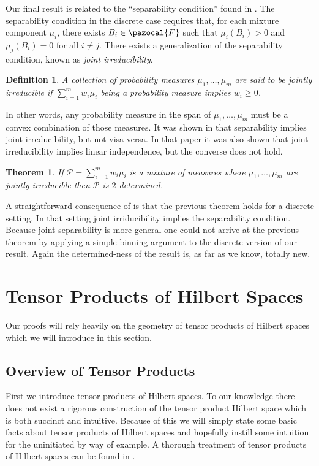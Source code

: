 \documentclass[aos]{imsart}
\def\sF{\pazocal{F}}
\def\sP{\mathscr{P}}
\theoremstyle{plain}
\newtheorem{thm}{Theorem}[section]
\theoremstyle{defintion}
\newtheorem{defin}{Definition}[section]
\begin{document}
	Our final result is related to the ``separability condition'' found in \cite{donoho03}. The separability condition in the discrete case requires that, for each mixture component $\mu_i$, there exists $B_i\in \sF$ such that $\mu_i\left( B_i \right)>0$ and $\mu_j\left( B_i \right) = 0$ for all $i\neq j$. There exists a generalization of the separability condition, known as {\em joint irreducibility}.
	\begin{defin}
		A collection of probability measures $\mu_1,\ldots,\mu_m$ are said to be {\em jointly irreducible} if $\sum_{i=1}^{m} w_i \mu_i$ being a probability measure implies $w_i\ge0$. 
	\end{defin}
	In other words, any probability measure in the span of $\mu_1,\ldots,\mu_m$ must be a convex combination of those measures. It was shown in \cite{blanchard14} that separability implies joint irreducibility, but not visa-versa. In that paper it was also shown that joint irreducibility implies linear independence, but the converse does not hold. 
	\begin{thm} \label{thm:ji}
		If $\sP= \sum_{i=1}^m w_i \mu_i $ is a mixture of measures where $\mu_1,\ldots, \mu_m$ are jointly irreducible then $\sP$ is $2$-determined.
	\end{thm}

	A straightforward consequence of \cite{arora12} is that the previous theorem holds for a discrete setting. In that setting joint irriducibility implies the separability condition. Because joint separability is more general one could not arrive at the previous theorem by applying a simple binning argument to the discrete version of our result. Again the determined-ness of the result is, as far as we know, totally new.
	
	\section{Tensor Products of Hilbert Spaces}
	Our proofs will rely heavily on the geometry of tensor products of Hilbert spaces which we will introduce in this section.

	\subsection{Overview of Tensor Products}
	First we introduce tensor products of Hilbert spaces. To our knowledge there does not exist a rigorous construction of the tensor product Hilbert space which is both succinct and intuitive. Because of this we will simply state some basic facts about tensor products of Hilbert spaces and hopefully instill some intuition for the uninitiated by way of example. A thorough treatment of tensor products of Hilbert spaces can be found in \cite{kadison83}.
\end{document}
